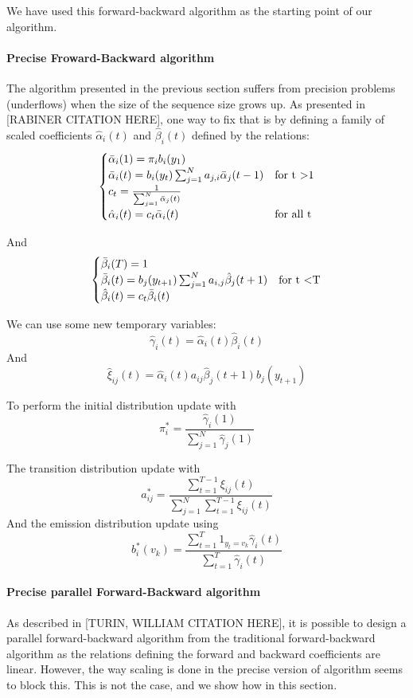We have used this forward-backward algorithm as the starting point of our algorithm.

\paragraph{Precise Froward-Backward algorithm}
The algorithm presented in the previous section suffers from precision problems (underflows) when the size of the sequence size grows up.
As presented in [RABINER CITATION HERE], one way to fix that is by defining a family of scaled coefficients $\hat{\alpha}_i(t)$ and $\hat{\beta}_i(t)$ defined by the relations:
\begin{equation}
\begin{cases}
\bar{\alpha}_i(1) = \pi_i b_i(y_1) & \\
\bar{\alpha}_i(t) = b_i(y_t)\sum_{j=1}^{N}{a_{j,i}\bar{\alpha}_j(t-1)} & \text{for t \textgreater 1} \\
c_t = \frac{1}{\sum^N_{j=1} \bar{\alpha}_j(t)} & \\
\hat{\alpha}_i(t) = c_t \bar{\alpha}_i(t) & \text{for all t}
\end{cases}
\end{equation}

And
\begin{equation}
\begin{cases}
\bar{\beta}_i(T) = 1 & \\
\bar{\beta}_i(t) = b_j(y_{t+1})\sum_{j=1}^{N}{a_{i,j}\hat{\beta}_j(t+1)} & \text{for t \textless T} \\
\hat{\beta}_i(t) = c_t \bar{\beta}_i(t)
\end{cases}
\end{equation}

We can use some new temporary variables:
\[\hat{\gamma}_i(t) = \hat{\alpha}_i(t)\hat{\beta}_i(t)\]
And
\[\hat{\xi}_{ij}(t)= \hat{\alpha}_i(t) a_{ij} \hat{\beta}_j(t+1) b_j(y_{t+1})\]

To perform the initial distribution update with
\[\pi_i^* = \frac{\hat{\gamma}_i(1)}{\sum_{j=1}^{N}\hat{\gamma}_j(1)}\]

The transition distribution update with
\[a_{ij}^*=\frac{\sum^{T-1}_{t=1}\xi_{ij}(t)}{\sum^{N}_{j=1}\sum^{T-1}_{t=1}\xi_{ij}(t)}\]
And the emission distribution update using
\[b_i^*(v_k)=\frac{\sum^T_{t=1} 1_{y_t=v_k} \hat{\gamma}_i(t)}{\sum^T_{t=1} \hat{\gamma}_i(t)}\]

\paragraph{Precise parallel Forward-Backward algorithm}
As described in [TURIN, WILLIAM CITATION HERE], it is possible to design a parallel forward-backward algorithm from the traditional forward-backward algorithm as the relations defining the forward and backward coefficients are linear. However, the way scaling is done in the precise version of algorithm seems to block this. This is not the case, and we show how in this section.

